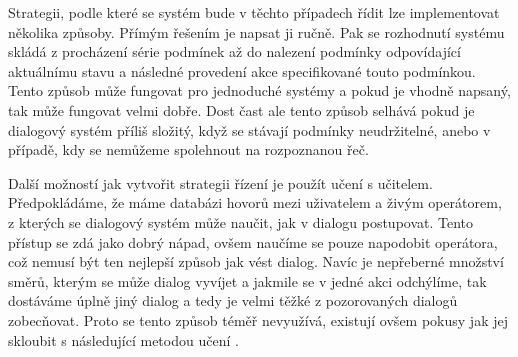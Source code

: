 Strategii, podle které se systém bude v těchto případech řídit lze
implementovat několika způsoby. Přímým řešením je napsat ji ručně. Pak se
rozhodnutí systému skládá z procházení série podmínek až do nalezení podmínky
odpovídající aktuálnímu stavu a následné provedení akce specifikované touto
podmínkou. Tento způsob může fungovat pro jednoduché systémy a pokud je vhodně
napsaný, tak může fungovat velmi dobře. Dost čast ale tento způsob selhává
pokud je dialogový systém příliš složitý, když se stávají podmínky
neudržitelné, anebo v případě, kdy se nemůžeme spolehnout na rozpoznanou řeč.

Další možností jak vytvořit strategii řízení je použít učení s učitelem.
Předpokládáme, že máme databázi hovorů mezi uživatelem a živým operátorem, z
kterých se dialogový systém může naučit, jak v dialogu postupovat. Tento
přístup se zdá jako dobrý nápad, ovšem naučíme se pouze napodobit operátora,
což nemusí být ten nejlepší způsob jak vést dialog. Navíc je nepřeberné
množství směrů, kterým se může dialog vyvíjet a jakmile se v jedné akci
odchýlíme, tak dostáváme úplně jiný dialog a tedy je velmi těžké z pozorovaných
dialogů zobecňovat. Proto se tento způsob téměř nevyužívá, existují ovšem
pokusy jak jej skloubit s následující metodou učení .
